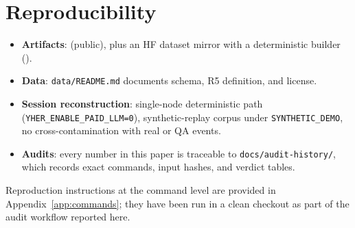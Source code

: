 \section{Reproducibility}
\label{sec:repro}

\begin{itemize}\setlength{\itemsep}{0pt}\setlength{\parskip}{0pt}\setlength{\parsep}{0pt}
\item \textbf{Artifacts}:  (public), plus an HF dataset mirror  with a deterministic builder ().
\item \textbf{Data}: \texttt{data/README.md} documents schema, R5 definition, and license.
\item \textbf{Session reconstruction}: single-node deterministic path (\texttt{YHER\_ENABLE\_PAID\_LLM=0}), synthetic-replay corpus under \texttt{SYNTHETIC\_DEMO}, no cross-contamination with real or QA events.
\item \textbf{Audits}: every number in this paper is traceable to \texttt{docs/audit-}\texttt{history/}, which records exact commands, input hashes, and verdict tables.
\end{itemize}

Reproduction instructions at the command level are provided in Appendix~\ref{app:commands}; they have been run in a clean checkout as part of the audit workflow reported here.
